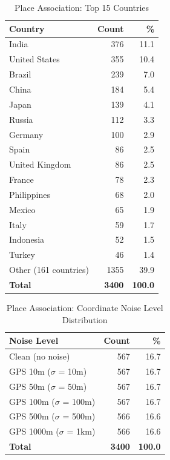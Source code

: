 \begin{table}[htbp]
\centering
\caption{Place Association: Top 15 Countries}
\label{tab:place_association_countries}
\begin{tabular}{lrr}
\toprule
\textbf{Country} & \textbf{Count} & \textbf{\%} \\
\midrule
India & 376 & 11.1 \\
United States & 355 & 10.4 \\
Brazil & 239 & 7.0 \\
China & 184 & 5.4 \\
Japan & 139 & 4.1 \\
Russia & 112 & 3.3 \\
Germany & 100 & 2.9 \\
Spain & 86 & 2.5 \\
United Kingdom & 86 & 2.5 \\
France & 78 & 2.3 \\
Philippines & 68 & 2.0 \\
Mexico & 65 & 1.9 \\
Italy & 59 & 1.7 \\
Indonesia & 52 & 1.5 \\
Turkey & 46 & 1.4 \\
\midrule
Other (161 countries) & 1355 & 39.9 \\
\midrule
\textbf{Total} & \textbf{3400} & \textbf{100.0} \\
\bottomrule
\end{tabular}
\end{table}

\begin{table}[htbp]
\centering
\caption{Place Association: Coordinate Noise Level Distribution}
\label{tab:place_association_noise}
\begin{tabular}{lrr}
\toprule
\textbf{Noise Level} & \textbf{Count} & \textbf{\%} \\
\midrule
Clean (no noise) & 567 & 16.7 \\
GPS 10m ($\sigma$ = 10m) & 567 & 16.7 \\
GPS 50m ($\sigma$ = 50m) & 567 & 16.7 \\
GPS 100m ($\sigma$ = 100m) & 567 & 16.7 \\
GPS 500m ($\sigma$ = 500m) & 566 & 16.6 \\
GPS 1000m ($\sigma$ = 1km) & 566 & 16.6 \\
\midrule
\textbf{Total} & \textbf{3400} & \textbf{100.0} \\
\bottomrule
\end{tabular}
\end{table}

